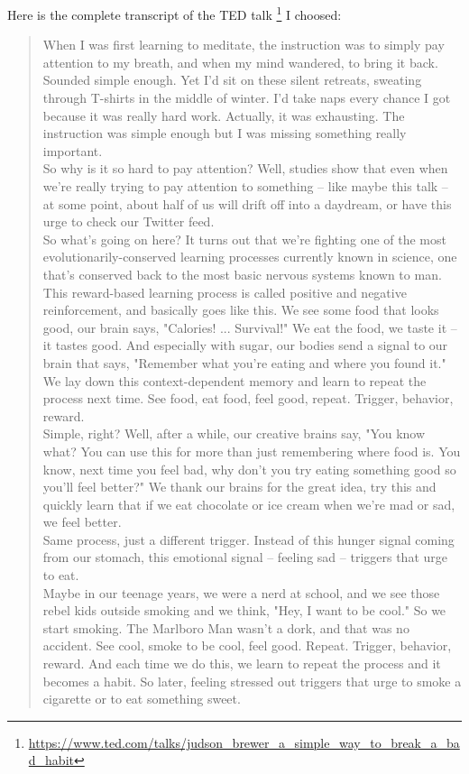 \documentclass[a4paper,dottedtoc,headinclude,footinclude]{report} %
\theoremstyle{plain}
\begin{document}
    Here is the complete transcript of the TED talk
    \footnote{\url{https://www.ted.com/talks/judson_brewer_a_simple_way_to_break_a_bad_habit}}
    I choosed:
    \begin{quote}
    When I was first learning to meditate, the instruction was to simply pay attention to my breath, and when my mind wandered, to bring it back.\\
    Sounded simple enough. Yet I'd sit on these silent retreats, sweating through T-shirts in the middle of winter. I'd take naps every chance I got because it was really hard work. Actually, it was exhausting. The instruction was simple enough but I was missing something really important.\\
    So why is it so hard to pay attention? Well, studies show that even when we're really trying to pay attention to something -- like maybe this talk -- at some point, about half of us will drift off into a daydream, or have this urge to check our Twitter feed.\\
    So what's going on here? It turns out that we're fighting one of the most evolutionarily-conserved learning processes currently known in science, one that's conserved back to the most basic nervous systems known to man.\\
    This reward-based learning process is called positive and negative reinforcement, and basically goes like this. We see some food that looks good, our brain says, "Calories! ... Survival!" We eat the food, we taste it -- it tastes good. And especially with sugar, our bodies send a signal to our brain that says, "Remember what you're eating and where you found it." We lay down this context-dependent memory and learn to repeat the process next time. See food, eat food, feel good, repeat. Trigger, behavior, reward.\\
    Simple, right? Well, after a while, our creative brains say, "You know what? You can use this for more than just remembering where food is. You know, next time you feel bad, why don't you try eating something good so you'll feel better?" We thank our brains for the great idea, try this and quickly learn that if we eat chocolate or ice cream when we're mad or sad, we feel better.\\
    Same process, just a different trigger. Instead of this hunger signal coming from our stomach, this emotional signal -- feeling sad -- triggers that urge to eat.\\
    Maybe in our teenage years, we were a nerd at school, and we see those rebel kids outside smoking and we think, "Hey, I want to be cool." So we start smoking. The Marlboro Man wasn't a dork, and that was no accident. See cool, smoke to be cool, feel good. Repeat. Trigger, behavior, reward. And each time we do this, we learn to repeat the process and it becomes a habit. So later, feeling stressed out triggers that urge to smoke a cigarette or to eat something sweet.\\

\end{quote}
\end{document}
